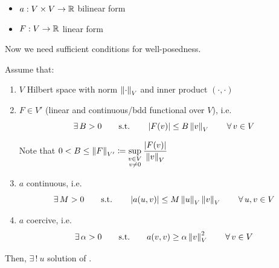 \let\oldcolumnseprule\relax
\newlength{\oldcolumnseprule}

\setlength{\oldcolumnseprule}{\columnseprule}

\setlength{\columnseprule}{0pt} %

\begin{multicols*}{2}
\begin{itemize}
    \item $a:V\times V\to \mathbb{R}$ bilinear form
    \item $F:V\to\mathbb{R}$ linear form
\end{itemize}
\end{multicols*}

\setlength{\columnseprule}{\oldcolumnseprule}

\newcolumn

Now we need sufficient conditions for well-posedness.

\begin{theorem} 
Assume that:
\begin{enumerate}[label=\textit{(\roman*)}]
\item $V$ Hilbert space with norm $\left\lVert \cdot \right\rVert_V$ and inner product $(\cdot,\cdot)$
\item $F\in V'$ (linear and continuous/bdd functional over $V\!$), i.e. 
\begin{equation*}
\exists\,B>0 \qquad\text{s.t.}\qquad\left\lvert F(v) \right\rvert\leq B\left\lVert v \right\rVert_V\qquad\forall\,v\in V 
\end{equation*}

Note that $0<B\leq \left\lVert F \right\rVert_{V'}\coloneq \displaystyle\sup_{\substack{v\in V \\ v\neq 0}} \frac{\left\lvert F(v) \right\rvert}{\left\lVert v \right\rVert_V} $ 

\item $a$ continuous, i.e. 
\begin{equation*}
\exists\,M>0 \qquad\text{s.t.}\qquad \left\lvert a(u,v) \right\rvert\leq M \left\lVert u \right\rVert_V\left\lVert v \right\rVert_V\qquad \forall\,u,v\in V
\end{equation*}

\item $a$ coercive, i.e.
\begin{equation*}
\exists\,\alpha>0 \qquad\text{s.t.}\qquad a(v,v)\geq \alpha \left\lVert v \right\rVert_V^2 \qquad\forall\,v \in V
\end{equation*}

\end{enumerate}
Then, $\exists\,!\ u$ solution of {}. 
\end{theorem}\vspace{-0.2cm}

